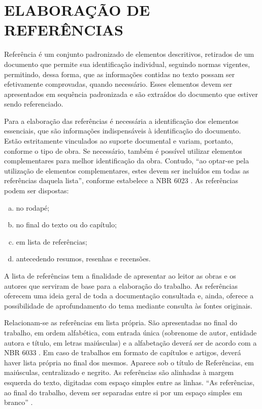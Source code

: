 \chapter{ELABORAÇÃO DE REFERÊNCIAS}
\label{cap:elementos5}

Referência é um conjunto padronizado de elementos descritivos, retirados de um documento que permite sua identificação individual, seguindo normas vigentes, permitindo, dessa forma, que as informações contidas no texto possam ser efetivamente comprovadas, quando necessário. Esses elementos devem ser apresentados em sequência padronizada e são extraídos do documento que estiver sendo referenciado.

Para a elaboração das referências é necessária a identificação dos elementos essenciais, que são informações indispensáveis à identificação do documento. Estão estritamente vinculados ao suporte documental e variam, portanto, conforme o tipo de obra. Se necessário, também é possível utilizar elementos complementares para melhor identificação da obra. Contudo, ``ao optar-se pela utilização de elementos complementares, estes devem ser incluídos em todas as referências daquela lista'', conforme estabelece a NBR 6023 \cite{NBR6023:2002}. As referências podem ser dispostas:

\begin{enumerate}[a)]
  \item	 no rodapé;
  \item	 no final do texto ou do capítulo;
  \item	 em lista de referências;
  \item	 antecedendo resumos, resenhas e recensões.
\end{enumerate}

A lista de referências tem a finalidade de apresentar ao leitor as obras e os autores que serviram de base para a elaboração do trabalho. As referências oferecem uma ideia geral de toda a documentação consultada e, ainda, oferece a possibilidade de aprofundamento do tema mediante consulta às fontes originais. 

Relacionam-se as referências em lista própria. São apresentadas no final do trabalho, em ordem alfabética, com entrada única (sobrenome de autor, entidade autora e título, em letras maiúsculas) e a alfabetação deverá ser de acordo com a NBR 6033 \cite{NBR6033:1989}. Em caso de trabalhos em formato de capítulos e artigos, deverá haver lista própria no final dos mesmos. Aparece sob o título de Referências, em maiúsculas, centralizado e negrito. As referências são alinhadas à margem esquerda do texto, digitadas com espaço simples entre as linhas. ``As referências, ao final do trabalho, devem ser separadas entre si por um espaço simples em branco'' \cite[p.10]{NBR14724:2011}.

